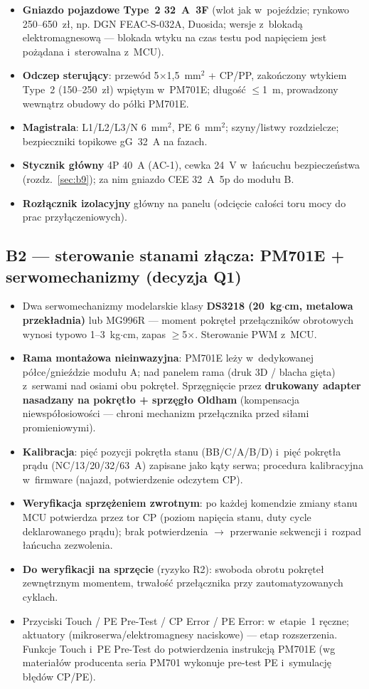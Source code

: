 \documentclass[11pt,a4paper]{article}
\begin{document}
\begin{itemize}
\item \textbf{Gniazdo pojazdowe Type~2 32~A~3F} (wlot jak w~pojeździe; rynkowo 250--650~zł, np. DGN FEAC-S-032A, Duosida; wersje z~blokadą elektromagnesową --- blokada wtyku na czas testu pod napięciem jest pożądana i~sterowalna z~MCU).
\item \textbf{Odczep sterujący}: przewód 5$\times$1,5~mm$^2$ + CP/PP, zakończony wtykiem Type~2 (150--250~zł) wpiętym w~PM701E; długość $\le$1~m, prowadzony wewnątrz obudowy do półki PM701E.
\item \textbf{Magistrala}: L1/L2/L3/N 6~mm$^2$, PE 6~mm$^2$; szyny/listwy rozdzielcze; bezpieczniki topikowe gG~32~A na fazach.
\item \textbf{Stycznik główny} 4P 40~A (AC-1), cewka 24~V w~łańcuchu bezpieczeństwa (rozdz.~\ref{sec:b9}); za nim gniazdo CEE 32~A~5p do modułu B.
\item \textbf{Rozłącznik izolacyjny} główny na panelu (odcięcie całości toru mocy do prac przyłączeniowych).
\end{itemize}

\subsection{B2 --- sterowanie stanami złącza: PM701E + serwomechanizmy (decyzja Q1)}
\label{sec:b2}

\begin{itemize}
\item Dwa serwomechanizmy modelarskie klasy \textbf{DS3218 (20~kg$\cdot$cm, metalowa przekładnia)} lub MG996R --- moment pokręteł przełączników obrotowych wynosi typowo 1--3~kg$\cdot$cm, zapas $\ge$5$\times$. Sterowanie PWM z~MCU.
\item \textbf{Rama montażowa nieinwazyjna}: PM701E leży w~dedykowanej półce/gnieździe modułu A; nad panelem rama (druk 3D / blacha gięta) z~serwami nad osiami obu pokręteł. Sprzęgnięcie przez \textbf{drukowany adapter nasadzany na pokrętło + sprzęgło Oldham} (kompensacja niewspółosiowości --- chroni mechanizm przełącznika przed siłami promieniowymi).
\item \textbf{Kalibracja}: pięć pozycji pokrętła stanu (BB/C/A/B/D) i~pięć pokrętła prądu (NC/13/20/32/63~A) zapisane jako kąty serwa; procedura kalibracyjna w~firmware (najazd, potwierdzenie odczytem CP).
\item \textbf{Weryfikacja sprzężeniem zwrotnym}: po każdej komendzie zmiany stanu MCU potwierdza przez tor CP (poziom napięcia stanu, duty cycle deklarowanego prądu); brak potwierdzenia $\rightarrow$ przerwanie sekwencji i~rozpad łańcucha zezwolenia.
\item \textbf{Do weryfikacji na sprzęcie} (ryzyko R2): swoboda obrotu pokręteł zewnętrznym momentem, trwałość przełącznika przy zautomatyzowanych cyklach.
\item Przyciski Touch / PE Pre-Test / CP Error / PE Error: w~etapie~1 ręczne; aktuatory (mikroserwa/elektromagnesy naciskowe) --- etap rozszerzenia. Funkcje Touch i~PE Pre-Test do potwierdzenia instrukcją PM701E (wg materiałów producenta seria PM701 wykonuje pre-test PE i~symulację błędów CP/PE).
\end{itemize}
\end{document}
